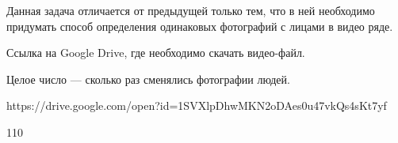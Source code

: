 
Данная задача отличается от предыдущей только тем, что в ней необходимо придумать способ определения одинаковых фотографий с лицами в видео ряде.


Ссылка на Google Drive, где необходимо скачать видео-файл.

\outputfmtSection

Целое число --- сколько раз сменялись фотографии людей.

\begin{myverbbox}[\small]{\vinput} 
    https://drive.google.com/open?id=1SVXlpDhwMKN2oDAes0u47vkQs4sKt7yf
\end{myverbbox}
\begin{myverbbox}[\small]{\voutput}
    110
\end{myverbbox}

